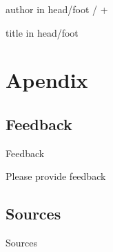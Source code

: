 \documentclass[english,aspectratio=169]{beamer}
\begin{document}
\appendix
{%
\begin{beamercolorbox}[wd=0.5\textwidth,ht=3ex,dp=1.5ex,leftskip=.5em,rightskip=.5em]{author in head/foot}%
%
\insertframenumber{} / \insertmainframenumber{} + \insertappendixframenumber{}\hfill\insertshortauthor%
\end{beamercolorbox}%
\vspace*{-4.5ex}\hspace*{0.5\textwidth}%
\begin{beamercolorbox}[wd=0.5\textwidth,ht=3ex,dp=1.5ex,left,leftskip=.5em]{title in head/foot}%
%
\insertshorttitle%
\end{beamercolorbox}%
}
\beamerdefaultoverlayspecification{}

\section*{Apendix}

\subsection*{Feedback}
\begin{frame}{Feedback}
\begin{center}
{  Please provide feedback}
\end{center}
\end{frame}

\subsection*{Sources}
\begin{frame}[allowframebreaks]{Sources}


\nocite{*}

\end{frame}
\end{document}
